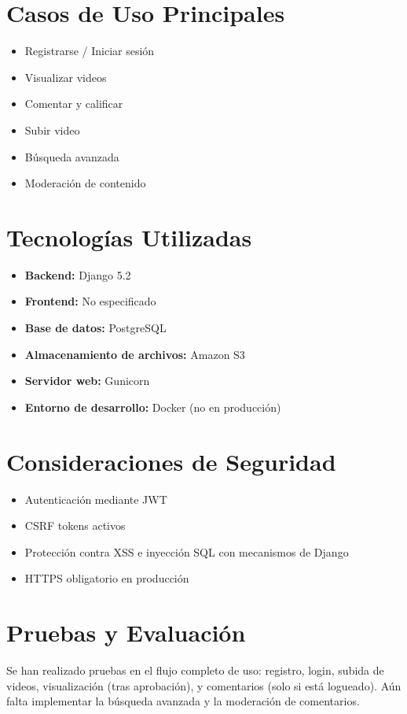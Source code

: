 \documentclass[12pt]{article}
\begin{document}
\section{Casos de Uso Principales}
\begin{itemize}
  \item Registrarse / Iniciar sesión
  \item Visualizar videos
  \item Comentar y calificar
  \item Subir video
  \item Búsqueda avanzada
  \item Moderación de contenido
\end{itemize}

\section{Tecnologías Utilizadas}
\begin{itemize}[leftmargin=*]
  \item \textbf{Backend:} Django 5.2
  \item \textbf{Frontend:} No especificado
  \item \textbf{Base de datos:} PostgreSQL
  \item \textbf{Almacenamiento de archivos:} Amazon S3
  \item \textbf{Servidor web:} Gunicorn
  \item \textbf{Entorno de desarrollo:} Docker (no en producción)
\end{itemize}

\section{Consideraciones de Seguridad}
\begin{itemize}[leftmargin=*]
  \item Autenticación mediante JWT
  \item CSRF tokens activos
  \item Protección contra XSS e inyección SQL con mecanismos de Django
  \item HTTPS obligatorio en producción
\end{itemize}

\section{Pruebas y Evaluación}
Se han realizado pruebas en el flujo completo de uso: registro, login, subida de videos, visualización (tras aprobación), y comentarios (solo si está logueado). Aún falta implementar la búsqueda avanzada y la moderación de comentarios.
\end{document}
